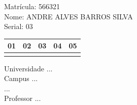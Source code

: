 \documentclass[10pt,a4paper,twocolumn]{report}
\begin{document}
Matrícula: 566321\\ Nome: ANDRE ALVES BARROS SILVA \\ Serial: 03\\
\begin{tabular}{|l|l|l|l|l|}\hline
01  &02  &03  &04  &05 \\ \hline 
 & & & & \\ \hline 
\end{tabular}
 \cleardoublepage 

\begin{flushleft}
Universidade ...\\
Campus ...\\
...\\
Professor ...\\
\end{flushleft}
\end{document}
